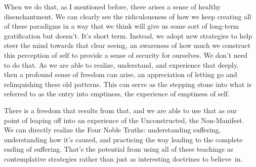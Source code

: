 When we do that, as I mentioned before, there arises a sense of healthy disenchantment. We can clearly see the ridiculousness of how we keep creating all of these paradigms in a way that we think will give us some sort of long-term gratification but doesn't. It's short term. Instead, we adopt new strategies to help steer the mind towards that clear seeing, an awareness of how much we construct this perception of self to provide a sense of security for ourselves. We don't need to do that. As we are able to realize, understand, and experience that deeply, then a profound sense of freedom can arise, an appreciation of letting go and relinquishing these old patterns. This can serve as the stepping stone into what is referred to as the entry into emptiness, the experience of emptiness of self.

There is a freedom that results from that, and we are able to use that as our point of leaping off into an experience of the Unconstructed, the Non-Manifest. We can directly realize the Four Noble Truths: understanding suffering, understanding how it's caused, and practicing the way leading to the complete ending of suffering. That's the potential from using all of these teachings as contemplative strategies rather than just as interesting doctrines to \mbox{believe in.}
